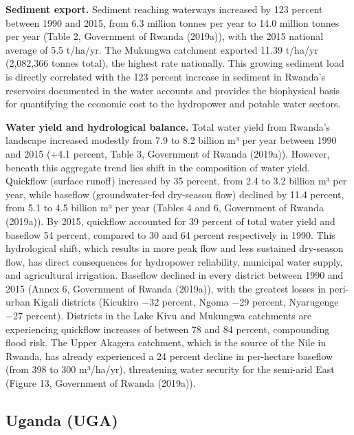 \documentclass[
  letterpaper,
  DIV=11,
  numbers=noendperiod]{scrartcl}
\begin{document}
\textbf{Sediment export.} Sediment reaching waterways increased by 123
percent between 1990 and 2015, from 6.3 million tonnes per year to 14.0
million tonnes per year (Table 2, Government of Rwanda (2019a)), with
the 2015 national average of 5.5 t/ha/yr. The Mukungwa catchment
exported 11.39 t/ha/yr (2,082,366 tonnes total), the highest rate
nationally. This growing sediment load is directly correlated with the
123 percent increase in sediment in Rwanda's reservoirs documented in
the water accounts and provides the biophysical basis for quantifying
the economic cost to the hydropower and potable water sectors.

\textbf{Water yield and hydrological balance.} Total water yield from
Rwanda's landscape increased modestly from 7.9 to 8.2 billion m³ per
year between 1990 and 2015 (+4.1 percent, Table 3, Government of Rwanda
(2019a)). However, beneath this aggregate trend lies shift in the
composition of water yield. Quickflow (surface runoff) increased by 35
percent, from 2.4 to 3.2 billion m³ per year, while baseflow
(groundwater-fed dry-season flow) declined by 11.4 percent, from 5.1 to
4.5 billion m³ per year (Tables 4 and 6, Government of Rwanda (2019a)).
By 2015, quickflow accounted for 39 percent of total water yield and
baseflow 54 percent, compared to 30 and 64 percent respectively in 1990.
This hydrological shift, which results in more peak flow and less
sustained dry-season flow, has direct consequences for hydropower
reliability, municipal water supply, and agricultural irrigation.
Baseflow declined in every district between 1990 and 2015 (Annex 6,
Government of Rwanda (2019a)), with the greatest losses in peri-urban
Kigali districts (Kicukiro −32 percent, Ngoma −29 percent, Nyarugenge
−27 percent). Districts in the Lake Kivu and Mukungwa catchments are
experiencing quickflow increases of between 78 and 84 percent,
compounding flood risk. The Upper Akagera catchment, which is the source
of the Nile in Rwanda, has already experienced a 24 percent decline in
per-hectare baseflow (from 398 to 300 m³/ha/yr), threatening water
security for the semi-arid East (Figure 13, Government of Rwanda
(2019a)).

\subsection{Uganda (UGA)}\label{sec-annex-uga}
\end{document}
